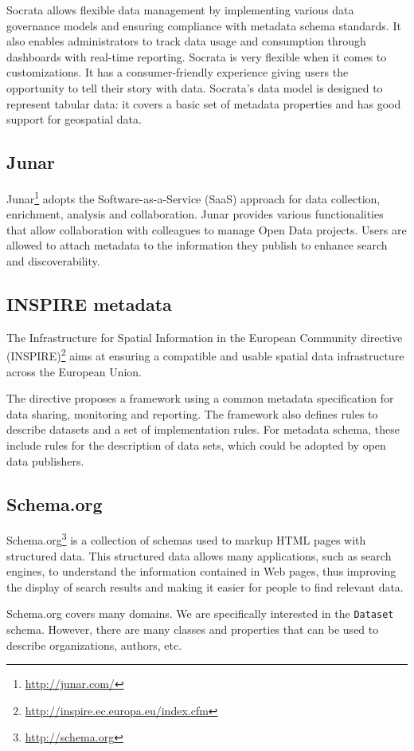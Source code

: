 Socrata allows flexible data management by implementing various data governance models and ensuring compliance with metadata schema standards. It also enables administrators to track data usage and consumption through dashboards with real-time reporting. Socrata is very flexible when it comes to customizations. It has a consumer-friendly experience giving users the opportunity to tell their story with data. Socrata's data model is designed to represent tabular data: it covers a basic set of metadata properties and has good support for geospatial data.

\subsection{Junar}
Junar\footnote{\url{http://junar.com/}} adopts the Software-as-a-Service (SaaS) approach for data collection, enrichment, analysis and collaboration. Junar provides various functionalities that allow collaboration with colleagues to manage Open Data projects. Users are allowed to attach metadata to the information they publish to enhance search and discoverability.

\subsection{INSPIRE metadata}
The Infrastructure for Spatial Information in the European Community directive (INSPIRE)\footnote{\url{http://inspire.ec.europa.eu/index.cfm}} aims at ensuring a compatible and usable spatial data infrastructure across the European Union.

The directive proposes a framework using a common metadata specification for data sharing, monitoring and reporting. The framework also defines rules to describe datasets and a set of implementation rules. For metadata schema, these include rules for the description of data sets, which could be adopted by open data publishers.

\subsection{Schema.org}
Schema.org\footnote{\url{http://schema.org}} is a collection of schemas used to markup HTML pages with structured data. This structured data allows many applications, such as search engines, to understand the information contained in Web pages, thus improving the display of search results and making it easier for people to find relevant data.

Schema.org covers many domains. We are specifically interested in the \texttt{Dataset} schema. However, there are many classes and properties that can be used to describe organizations, authors, etc.

